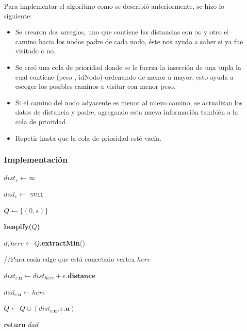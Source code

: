\documentclass[letterpaper,11pt]{article}
\begin{document}
\begin{table}[h]
\begin{tabu}
                \end{tabu}
            \end{table}
            
            Para implementar el algoritmo como se describió anteriormente, se hizo lo siguiente:

            \begin{itemize}
                \item Se crearon dos arreglos, uno que contiene las distancias con $\infty$ y otro el camino hacia los nodos padre de cada nodo, éste nos ayuda a saber si ya fue visitado o no.
                \item Se creó una cola de prioridad donde se le fuerza la inserción de una tupla la cual contiene (peso , idNodo)  ordenando de menor a mayor, esto ayuda a escoger los posibles caminos a visitar con menor peso.
                \item Si el camino del nodo adyacente es menor al nuevo camino, se actualizan los datos de distancia y padre, agregando esta nueva información también a la cola de prioridad.
                \item Repetir hasta que la cola de prioridad esté vacía.
            \end{itemize}

        \subsubsection{Implementación}
        \begin{algorithm}[H]
            {
                $dist_v \gets \infty$

                $dad_v \gets $ \textsc{null}
            }
            $Q \gets \{(0,s)\}$   

            \textbf{heapify($Q$)}

            {
                $d,here \gets Q.$\textbf{extractMin}() 

                //Para cada edge que está conectado vertex $here$

                {
                    {
                        $dist_{e.\textbf{u}} \gets dist_{here} + e.\textbf{distance}$
                        
                        $dad_{e.\textbf{u}} \gets here$
    
                        $Q \gets Q \cup (dist_{e.\textbf{u}}, e.\textbf{u})$ 
                    } 
                } 
            }
            \textbf{return} $dad$
        \end{algorithm}
\end{document}
